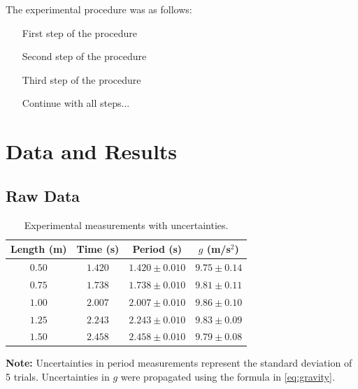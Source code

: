 \documentclass[11pt,a4paper]{article}
\providecommand{\toprule}{\hline\hline}
\providecommand{\midrule}{\hline}
\providecommand{\bottomrule}{\hline\hline}
\begin{document}

The experimental procedure was as follows:
\begin{enumerate}
    \item [First step of the procedure]
    \item [Second step of the procedure]
    \item [Third step of the procedure]
    \item [Continue with all steps...]
\end{enumerate}


\section{Data and Results}
\label{sec:results}

\subsection{Raw Data}


\begin{table}[htbp]
\centering
\caption{Experimental measurements with uncertainties.}
\label{tab:raw-data}
\begin{tabular}{@{}cccc@{}}
\toprule
\textbf{Length (m)} & \textbf{Time (s)} & \textbf{Period (s)} & \textbf{$g$ (m/s$^2$)} \\
\midrule
$0.50$ & $1.420$ & $1.420 \pm 0.010$ & $9.75 \pm 0.14$ \\
$0.75$ & $1.738$ & $1.738 \pm 0.010$ & $9.81 \pm 0.11$ \\
$1.00$ & $2.007$ & $2.007 \pm 0.010$ & $9.86 \pm 0.10$ \\
$1.25$ & $2.243$ & $2.243 \pm 0.010$ & $9.83 \pm 0.09$ \\
$1.50$ & $2.458$ & $2.458 \pm 0.010$ & $9.79 \pm 0.08$ \\
\bottomrule
\end{tabular}
\end{table}

\textbf{Note:} Uncertainties in period measurements represent the standard deviation of 5 trials. Uncertainties in $g$ were propagated using the formula in \ref{eq:gravity}.
\end{document}
